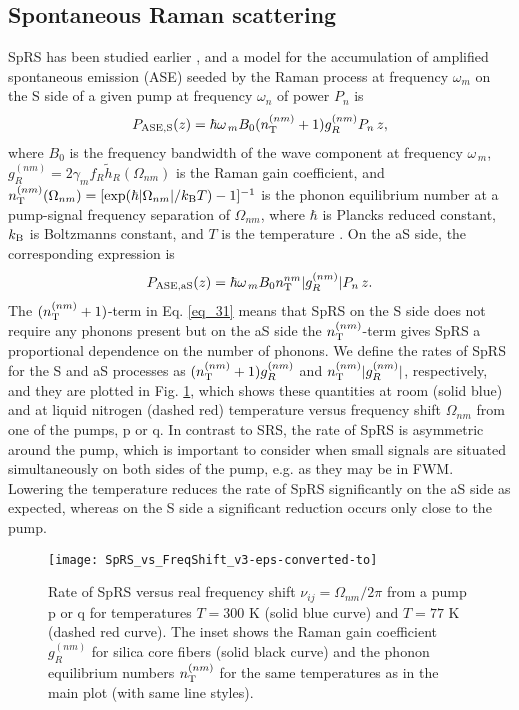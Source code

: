 \documentclass[10pt,letterpaper]{article}
\begin{document}
\subsection{Spontaneous Raman scattering \label{sec_1}}
SpRS has been studied earlier \cite{Rottwitt_2003,Stolen_1970}, and a model for the accumulation of amplified spontaneous emission (ASE) seeded by the Raman process at frequency $\omega_m$ on the S side of a given pump at frequency $\omega_n$ of power $P_n$ is
\begin{eqnarray} \label{eq_31}
P_{\rm ASE,S}(z) = \hbar \omega_{\,m} B_0 (n^{(nm)}_{\rm T}+1)g^{(nm)}_{ R} P_n\, z,
\end{eqnarray}
where $B_0$ is the frequency bandwidth of the wave component at frequency $\omega_{\, m}$, $g^{(nm)}_{R} = 2 \gamma_{m} f_R \tilde h_R(\Omega_{nm})$ is the Raman gain coefficient, and $n^{(nm)}_{\rm T}(\Omega_{nm})=[\exp(\hbar |\Omega_{nm}|/k_{\rm B}T)-1]^{-1}$ is the phonon equilibrium number at a pump-signal frequency separation of $\Omega_{nm}$, where $\hbar$ is Plancks reduced constant, $k_{\rm B}$ is Boltzmanns constant, and $T$ is the temperature \cite{Kidorf_1999}. On the aS side, the corresponding expression is
\begin{eqnarray}
P_{\rm ASE,aS}(z) = \hbar \omega_{\, m} B_0 n^{nm}_{\rm T}|g^{(nm)}_{R}| P_n\,z.
\end{eqnarray}
The $(n^{(nm)}_{\rm T} +1)$-term in Eq. \eqref{eq_31} means that SpRS on the S side does not require any phonons present but on the aS side the $n^{(nm)}_{\rm T}$-term gives SpRS a proportional dependence on the number of phonons. We define the rates of SpRS for the S and aS processes as $(n^{(nm)}_{\rm T} +1)g^{(nm)}_{R}$ and $n^{(nm)}_{\rm T}|g^{(nm)}_{R}|$, respectively, and they are plotted in Fig. \ref{fig_2}, which shows these quantities at room (solid blue) and at liquid nitrogen (dashed red) temperature versus frequency shift $\Omega_{nm}$ from one of the pumps, p or q. In contrast to SRS, the rate of SpRS is asymmetric around the pump, which is important to consider when small signals are situated simultaneously on both sides of the pump, e.g. as they may be in FWM. Lowering the temperature reduces the rate of SpRS significantly on the aS side as expected, whereas on the S side a significant reduction occurs only close to the pump.

\begin{figure}
\centering
\texttt{[image: SpRS\_vs\_FreqShift\_v3-eps-converted-to]}
\caption{Rate of SpRS versus real frequency shift $\nu_{ij} = \Omega_{nm}/2\pi$ from a pump p or q for temperatures $T = 300$ K (solid blue curve) and $T = 77$ K (dashed red curve). The inset shows the Raman gain coefficient $g^{(nm)}_{R}$ for silica core fibers (solid black curve) and the phonon equilibrium numbers $n^{(nm)}_{\rm T}$ for the same temperatures as in the main plot (with same line styles).}\label{fig_2}
\end{figure}
\end{document}
